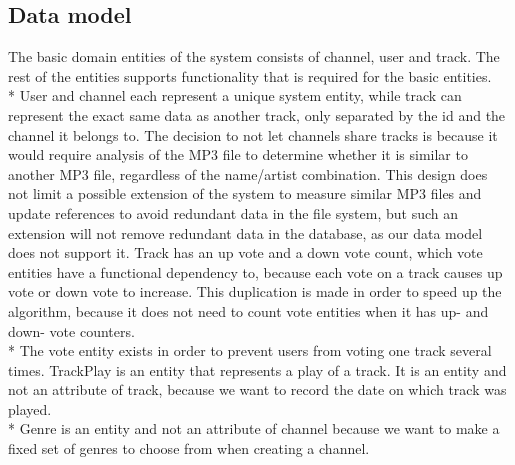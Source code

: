 \documentclass[a4paper,11pt,report]{article}
\begin{document}
\subsection{Data model}
The basic domain entities of the system consists of channel, user and track. The rest of the entities supports functionality that is required for the basic entities. \\*
User and channel each represent a unique system entity, while track can represent the exact same data as another track, only separated by the id and the channel it belongs to.
The decision to not let channels share tracks is because it would require analysis of the MP3 file to determine whether it is similar to another MP3 file, regardless of the name/artist combination.
This design does not limit a possible extension of the system to measure similar MP3 files and update references to avoid redundant data in the file system, but such an extension will not remove redundant data in the database, as our data model does not support it. 
Track has an up vote and a down vote count, which vote entities have a functional dependency to, because each vote on a track causes up vote or down vote to increase. This duplication is made in order to speed up the algorithm, because it does not need to count vote entities when it has up- and down- vote counters. \\*
The vote entity exists in order to prevent users from voting one track several times.
TrackPlay is an entity that represents a play of a track. It is an entity and not an attribute of track, because we want to record the date on which track was played. \\*
Genre is an entity and not an attribute of channel because we want to make a fixed set of genres to choose from when creating a channel.
\end{document}
